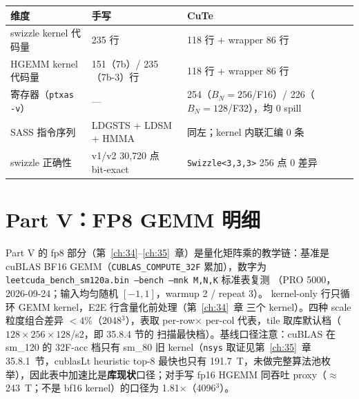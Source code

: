 \begin{center}\small
\begin{tabular}{llp{6.2cm}}
\toprule
维度 & 手写 & CuTe \\
\midrule
swizzle kernel 代码量 & 235 行 & 118 行 + wrapper 86 行 \\
HGEMM kernel 代码量 & 151（7b）/ 235（7b-3）行 & 118 行 + wrapper 86 行 \\
寄存器（\texttt{ptxas -v}） & — & 254（$B_N{=}256$/F16）/ 226（$B_N{=}128$/F32），均 0 spill \\
SASS 指令序列 & LDGSTS + LDSM + HMMA & 同左；kernel 内联汇编 0 条 \\
swizzle 正确性 & v1/v2 30{,}720 点 bit-exact & \texttt{Swizzle\allowbreak{}<3,\allowbreak{}3,\allowbreak{}3>} 256 点 0 差异 \\
\bottomrule
\end{tabular}
\end{center}

\section{Part V：FP8 GEMM 明细}

Part V 的 fp8 部分（第~\ref{ch:34}--\ref{ch:35}~章）是量化矩阵乘的教学链：基准是
cuBLAS BF16 GEMM（\texttt{CUBLAS\_\allowbreak{}COMPUTE\_\allowbreak{}32F} 累加），数字为
\texttt{leetcuda\_bench\_sm120a.bin --bench --mnk M,N,K} 标准表复测
（PRO 5000，2026-09-24；输入均匀随机 $[-1,1]$，warmup 2 / repeat 3）。
kernel-only 行只循环 GEMM kernel，E2E 行含量化前处理（第~\ref{ch:34}~章
三个 kernel）。四种 scale 粒度组合差异 $<4\%$（2048$^3$），表取 per-row$\times$
per-col 代表，tile 取库默认档（$128\times256\times128$/s2，即 35.8.4 节的
扫描最快档）。基线口径注意：cuBLAS 在 sm\_120 的 32F-acc 档只有 sm\_80
旧 kernel（\texttt{nsys} 取证见第~\ref{ch:35}~章 35.8.1~节，cublasLt
heuristic top-8 最快也只有 191.7~T，未做完整算法池枚举），因此表中加速比是\textbf{库现状}口径；对手写
fp16 HGEMM 同吞吐 proxy（$\approx$243~T；不是 bf16 kernel）的口径为 1.81$\times$（4096$^3$）。

